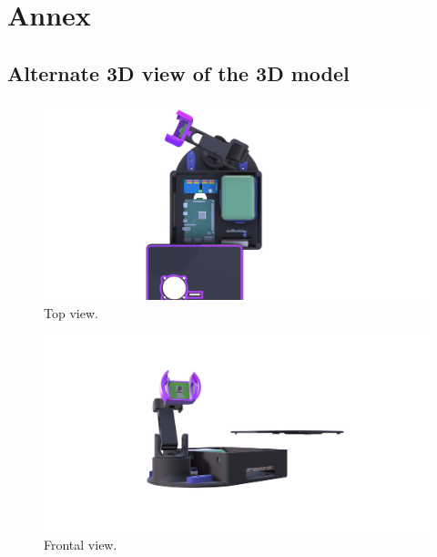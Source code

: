 
\setcounter{secnumdepth}{0}
\section{Annex}
\subsection{Alternate 3D view of the 3D model}

\begin{figure}[h]
    \centering
    \includegraphics[width = \textwidth]{resources/altview1.png}
    \caption{Top view.}
    \label{fig:top_view}
  \end{figure}
  \begin{figure}[h]
      \centering
      \includegraphics[width = \textwidth]{resources/altview2.png}
      \caption{Frontal view.}
      \label{fig:front_view}
    \end{figure}

